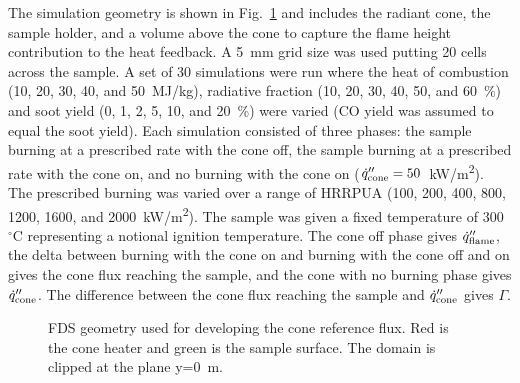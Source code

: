 The simulation geometry is shown in Fig.~\ref{fig:cone_ref_geom} and includes the radiant cone, the sample holder, and a volume above the cone to capture the flame height contribution to the heat feedback. A 5~mm grid size was used putting 20 cells across the sample. A set of 30 simulations were run where the heat of combustion (10, 20, 30, 40, and 50~\unit{MJ/kg}), radiative fraction (10, 20, 30, 40, 50, and 60~\%) and soot yield (0, 1, 2, 5, 10, and 20~\%) were varied (CO yield was assumed to equal the soot yield). Each simulation consisted of three phases: the sample burning at a prescribed rate with the cone off, the sample burning at a prescribed rate with the cone on, and no burning with the cone on ($\dot{q}_{\rm cone}''=50$~\unit{kW/m^2}). The prescribed burning was varied over a range of HRRPUA (100, 200, 400, 800, 1200, 1600, and 2000~\unit{kW/m^2}). The sample was given a fixed temperature of 300~$^\circ$C representing a notional ignition temperature. The cone off phase gives
$\dot{q}_{\rm flame}''$, the delta between burning with the cone on and burning with the cone off and on gives the cone flux reaching the sample, and the cone with no burning phase gives $\dot{q}_{\rm cone}''$. The difference between the cone flux reaching the sample and $\dot{q}_{\rm cone}''$ gives $\Gamma$.

\begin{figure}
    \begin{center}
        \caption[FDS geometry used for developing the cone reference flux]{\label{fig:cone_ref_geom} FDS geometry used for developing the cone reference flux. Red is the cone heater and green is the sample surface. The domain is clipped at the plane y=0~m.}
    \end{center}
\end{figure}

